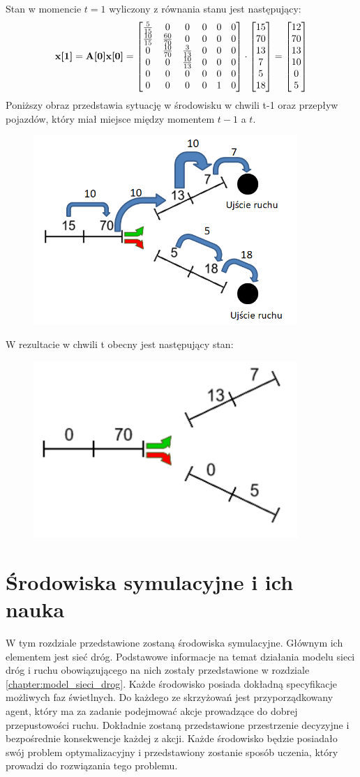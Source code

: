 \documentclass[12pt]{book}
\theoremstyle{plain}
\begin{document}
Stan w momencie $t=1$ wyliczony z równania stanu jest następujący:
\[\textbf{x[1]}=\textbf{A[0]x[0]}=\begin{bmatrix} \frac{5}{15} & 0 & 0 & 0 & 0 & 0 \\ \frac{10}{15} & \frac{60}{70} & 0 & 0 & 0 & 0 \\ 0 & \frac{10}{70} & \frac{3}{13} & 0 & 0 & 0 \\ 0 & 0 & \frac{10}{13} & 0 & 0 & 0 \\ 0 & 0 & 0 & 0 & 0 & 0 \\ 0 & 0 & 0 & 0 & 1 & 0 \end{bmatrix} \cdot \begin{bmatrix} 15 \\ 70 \\ 13 \\ 7 \\ 5 \\ 18 \end{bmatrix} = \begin{bmatrix} 12 \\ 70 \\ 13 \\ 10 \\ 0 \\ 5 \end{bmatrix} \]
Poniższy obraz przedstawia sytuację w środowisku w chwili t-1 oraz przepływ pojazdów, który miał miejsce między momentem $t-1$ a $t$.
\begin{figure}[H]
	\centering
	\includegraphics[width=10cm]{images/env_11_przeplyw_korek}
	\label{fig:env_11_case_0_przeplyw}
\end{figure}\noindent
W rezultacie w chwili t obecny jest następujący stan:
\begin{figure}[H]
	\centering
	\includegraphics[width=10cm]{images/env_11_po_korku}
	\label{fig:env_11_case_0_po_przeplywie}
\end{figure}\noindent


\chapter {Środowiska symulacyjne i ich nauka}
W tym rozdziale przedstawione zostaną środowiska symulacyjne. Głównym ich elementem jest sieć dróg. Podstawowe informacje na temat działania modelu sieci dróg i ruchu obowiązującego na nich zostały przedstawione w rozdziale \ref{chapter:model_sieci_drog}. Każde środowisko posiada dokładną specyfikacje możliwych faz świetlnych. Do każdego ze skrzyżowań jest przyporządkowany agent, który ma za zadanie podejmować akcje prowadzące do dobrej przepustowości ruchu. Dokładnie zostaną przedstawione przestrzenie decyzyjne i bezpośrednie konsekwencje każdej z akcji. Każde środowisko będzie posiadało swój problem optymalizacyjny i przedstawiony zostanie sposób uczenia, który prowadzi do rozwiązania tego problemu. 
\end{document}
